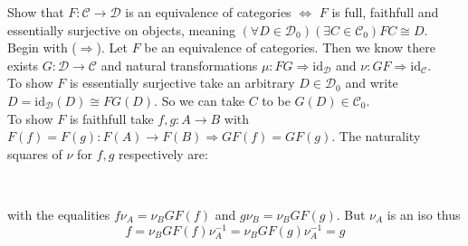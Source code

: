\documentclass[11pt]{article}
\theoremstyle{plain}
\theoremstyle{definition}
\theoremstyle{remark}
\newcommand{\cC}{\mathcal{C}}
\newcommand{\cD}{\mathcal{D}}
\newcommand{\id}{\mathrm{id}}
\begin{document}


Show that $F:\cC \to \cD$ is an equivalence of categories $\iff$ $F$ is full, faithfull and essentially surjective on objects, meaning $(\forall D \in \cD_0 )(\exists C \in \cC_0) FC\cong D$.\\
Begin with ($\Rightarrow$). Let $F$ be an equivalence of categories. Then we know there exists $G: \cD \to \cC$ and natural transformations $\mu :FG \Rightarrow \id_{\cD}$ and $\nu:GF \Rightarrow \id_{\cC}$.\\
To show $F$ is essentially surjective take an arbitrary $D \in \cD_0$ and write $D=\id_{\cD}(D)\cong FG(D)$. So we can take $C$ to be $G(D) \in \cC_0$.\\
To show $F$ is faithfull take $f,g:A \to B$ with $F(f)=F(g): F(A)\to F(B) \Rightarrow GF(f)=GF(g)$. The naturality squares of $\nu$ for $f,g$ respectively are:

\begin{center}
\\
\end{center}
with the equalities $f\nu_A=\nu_B GF(f)$ and $g \nu_B=\nu_BGF(g)$. But $\nu_A$ is an iso thus \[f=\nu_B GF(f)\nu_A^{-1}=\nu_B GF(g)\nu_A^{-1}=g\]
\end{document}
